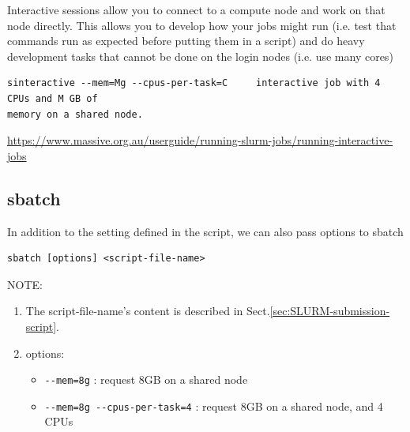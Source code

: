 Interactive sessions allow you to connect to a compute node and work on that
node directly. This allows you to develop how your jobs might run (i.e. test
that commands run as expected before putting them in a script) and do heavy
development tasks that cannot be done on the login nodes (i.e. use many cores)

\begin{verbatim}
sinteractive --mem=Mg --cpus-per-task=C 	interactive job with 4 CPUs and M GB of
memory on a shared node.
\end{verbatim}

\url{https://www.massive.org.au/userguide/running-slurm-jobs/running-interactive-jobs}

\subsection{sbatch}
\label{sec:sbatch}

In addition to the setting defined in the script, we can also pass options to
sbatch
\begin{verbatim}
sbatch [options] <script-file-name>
\end{verbatim}

NOTE:
\begin{enumerate}
  \item  The script-file-name's content is described in
Sect.\ref{sec:SLURM-submission-script}.

  \item options:
  
  
\begin{itemize}
  \item \verb!--mem=8g!  : request 8GB on a shared node
  
  \item \verb!--mem=8g --cpus-per-task=4! : request 8GB on a shared node, and 4
  CPUs
  
\end{itemize}   
\end{enumerate}

